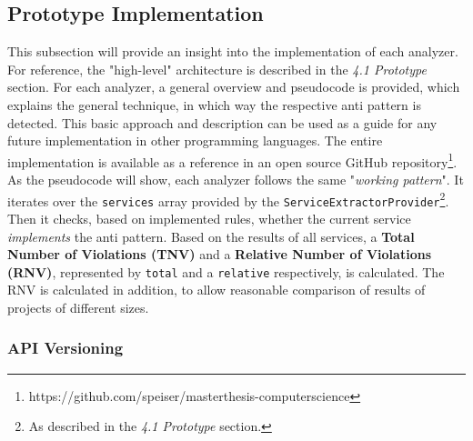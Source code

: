 \documentclass{article}
\begin{document}
\subsection{Prototype Implementation}
This subsection will provide an insight into the implementation of each analyzer. For reference, the "high-level" architecture is described in the \textit{4.1 Prototype} section. For each analyzer, a general overview and pseudocode is provided, which explains the general technique, in which way the respective anti pattern is detected. This basic approach and description can be used as a guide for any future implementation in other programming languages. The entire implementation is available as a reference in an open source GitHub repository\footnote{https://github.com/speiser/masterthesis-computerscience}. As the pseudocode will show, each analyzer follows the same "\textit{working pattern}". It iterates over the \lstinline{services} array provided by the \lstinline{ServiceExtractorProvider}\footnote{As described in the \textit{4.1 Prototype} section.}. Then it checks, based on implemented rules, whether the current service \textit{implements} the anti pattern. Based on the results of all services, a \textbf{Total Number of Violations (TNV)} and a \textbf{Relative Number of Violations (RNV)}, represented by \lstinline{total} and a \lstinline{relative} respectively, is calculated. The RNV is calculated in addition, to allow reasonable comparison of results of projects of different sizes.

\subsubsection{API Versioning}
\end{document}
